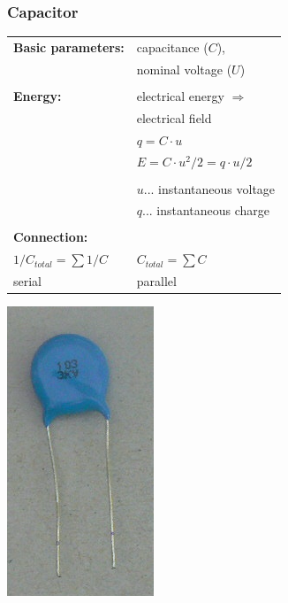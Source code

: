 \documentclass{beamer}
\begin{document}
	\begin{frame}
    \frametitle{Capacitor}
		\begin{center}
		\begin{tabular}{l l}
			\textbf{Basic parameters:} 	& capacitance ($C$),\\
																	& nominal voltage ($U$)\\ \\ \hline
			\textbf{Energy:}						& electrical energy $\Rightarrow$\\
																	& electrical field\\
																	& $q = C\cdot u$\\
																	& $E = C\cdot u^2/ 2 = q \cdot u/2$\\\\
																	& $u$... instantaneous voltage\\
																	& $q$... instantaneous charge\\\\ \hline
		  \textbf{Connection:}				& \\
			$1/C_{total}= \sum{1/C}$				& $C_{total}= \sum{C}$\\
			serial											& parallel
		\end{tabular}
		\includegraphics[scale=0.3]{obr05_kondenzator.png}
		\end{center}
  \end{frame}
\end{document}
